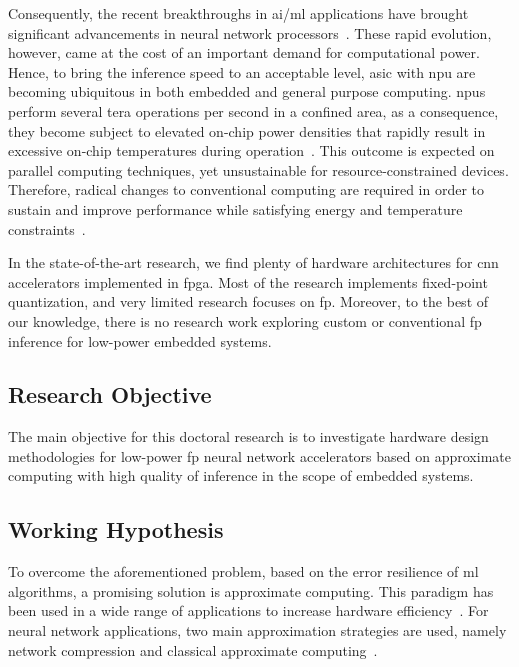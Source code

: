 Consequently, the recent breakthroughs in \gls{ai}/\gls{ml} applications have brought significant advancements in neural network processors~\cite{jouppi2017datacenter}. These rapid evolution, however, came at the cost of an important demand for computational power. Hence, to bring the inference speed to an acceptable level, \gls{asic} with \gls{npu} are becoming ubiquitous in both embedded and general purpose computing. \glspl{npu} perform several tera operations per second in a confined area, as a consequence, they become subject to elevated on-chip power densities that rapidly result in excessive on-chip temperatures during operation~\cite{amrouch2020npu}. This outcome is expected on parallel computing techniques, yet unsustainable for resource-constrained devices.
Therefore, radical changes to conventional computing are required in order to sustain and improve performance while satisfying energy and temperature constraints~\cite{gillani2020exploiting}.

In the state-of-the-art research, we find plenty of hardware architectures for \gls{cnn} accelerators implemented in \gls{fpga}. Most of the research implements fixed-point quantization, and very limited research focuses on \gls{fp}. Moreover, to the best of our knowledge, there is no research work exploring custom or conventional \gls{fp} inference for low-power embedded systems.

\subsection{Research Objective}
The main objective for this doctoral research is to investigate hardware design methodologies for low-power \gls{fp} neural network accelerators based on approximate computing with high quality of inference in the scope of embedded systems.

\subsection{Working Hypothesis}
To overcome the aforementioned problem, based on the error resilience of \gls{ml} algorithms, a promising solution is approximate computing. This paradigm has been used in a wide range of applications to increase hardware efficiency~\cite{han2013approximate}. For neural network applications, two main approximation strategies are used, namely network compression and classical approximate computing~\cite{bouvier2019spiking}.



